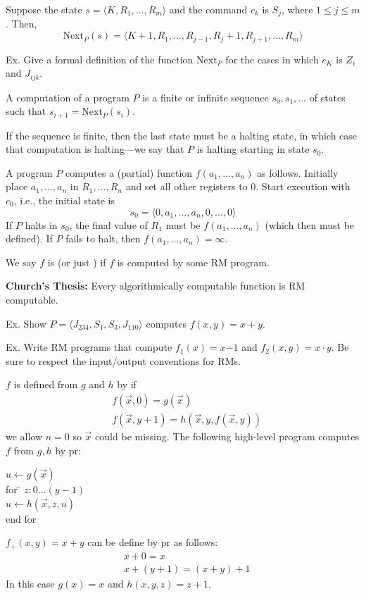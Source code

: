 \begin{frame}
Suppose the state $s=\langle K,R_1,\ldots,R_m\rangle$ and the command
$c_k$ is $S_j$, where $1\le j\le m$.  Then,
$$
\text{Next}_P(s)=\langle
K+1,R_1,\ldots,R_{j-1},R_j+1,R_{j+1},\ldots,R_m\rangle
$$

Ex. Give a formal definition of the function $\text{Next}_P$ for the cases
in which $c_K$ is $Z_i$ and $J_{ijk}$.
\end{frame}

\begin{frame}
A computation of a program $P$ is a finite or infinite sequence
$s_0,s_1,\ldots$ of states such that $s_{i+1}=\text{Next}_P(s_i)$. 

If the sequence is finite, then the last state must be a halting
state, in which case that computation is halting---we say that $P$ is
halting starting in state $s_0$.

A program $P$ computes a (partial) function $f(a_1,\ldots,a_n)$ as
follows.  Initially place $a_1,\ldots,a_n$ in $R_1,\ldots,R_n$ and set
all other registers to 0.  Start execution with $c_0$, i.e., the
initial state is
$$
s_0=\langle 0,a_1,\ldots,a_n,0,\ldots,0\rangle
$$
If $P$ halts in $s_0$, the final value of $R_1$ must be
$f(a_1,\ldots,a_n)$ (which then must be defined).  If $P$ fails to
halt, then $f(a_1,\ldots,a_n)=\infty$.
\end{frame}

\begin{frame}
We say $f$ is  (or just ) if $f$ is
computed by some RM program.

{\bf Church's Thesis:}  Every algorithmically computable function is
RM computable.

Ex. Show $P=\langle J_{234},S_1,S_3,J_{110}\rangle$ computes $f(x,y)=x+y$.

Ex. Write RM programs that compute $f_1(x)=x\stackrel{.}{-}1$ and
$f_2(x,y)=x\cdot y$.  Be sure to respect the input/output conventions
for RMs.
\end{frame}

\begin{frame}
$f$ is defined from $g$ and $h$ by  if
\begin{align*}
& f(\vec{x},0)=g(\vec{x}) \\
& f(\vec{x},y+1)=h(\vec{x},y,f(\vec{x},y))
\end{align*}
we allow $n=0$ so $\vec{x}$ could be missing.
The following high-level program computes $f$ from $g,h$ by
pr:
\begin{tabbing}
$u\leftarrow g(\vec{x})$ \\
for \= $z:0\ldots(y-1)$ \\
    \> $u\leftarrow h(\vec{x},z,u)$ \\
end for
\end{tabbing}

$f_+(x,y)=x+y$ can be define by pr as follows:
\begin{align*}
& x+0=x \\
& x+(y+1)=(x+y)+1
\end{align*}
In this case $g(x)=x$ and $h(x,y,z)=z+1$.
\end{frame}


